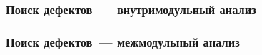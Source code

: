 \documentclass[14pt]{beamer}
\begin{document}
\begin{frame}
\frametitle{Поиск дефектов~--- внутримодульный анализ}
\begin{figure}[h]
\end{figure}
\end{frame}

\begin{frame}
\frametitle{Поиск дефектов~--- межмодульный анализ}
\begin{figure}[h]
\end{figure}
\end{frame}
\end{document}
